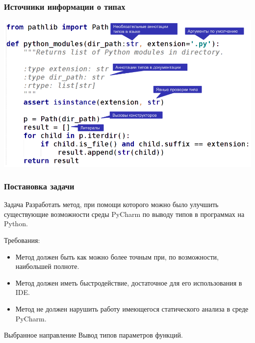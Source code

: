 \documentclass[handout]{beamer}
\begin{document}
\begin{frame}[fragile]
  \frametitle{Источники информации о типах}



  \includegraphics[width=0.9\paperwidth]{fig/type-sources-annotated.png}
    
\end{frame}

\begin{frame}
    \frametitle{Постановка задачи}
    \begin{block}{Задача}
        Разработать метод, при помощи которого можно было улучшить существующие
        возможности среды PyCharm по выводу типов в программах на Python.
    \end{block}

    Требования:
    \begin{itemize}
        \item Метод должен быть как можно более точным при, по возможности,
          наибольшей полноте.

        \item Метод должен иметь быстродействие, достаточное для его использования в
          IDE.

        \item Метод не должен нарушить работу имеющегося статического анализа в
          среде PyCharm.
    \end{itemize}
    
    \begin{block}{Выбранное направление}
      Вывод типов параметров функций.
    \end{block}

\end{frame}
\end{document}
